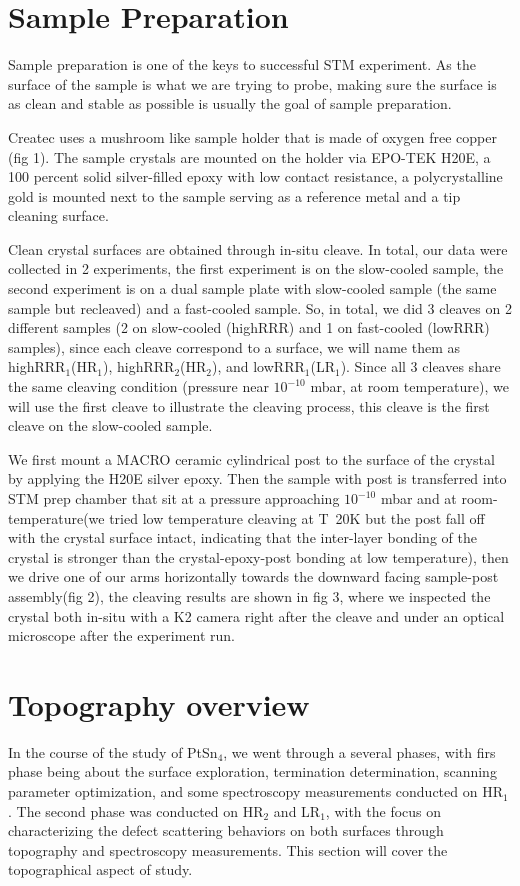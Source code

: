 \section{Sample Preparation}

Sample preparation is one of the keys to successful STM experiment. As the surface of the sample is what we are trying to probe, making sure the surface is as clean and stable as possible is usually the goal of sample preparation. 
\par Createc uses a mushroom like sample holder that is made of oxygen free copper (fig 1). The sample crystals are mounted on the holder via EPO-TEK H20E, a 100 percent solid silver-filled epoxy with low contact resistance, a polycrystalline gold is mounted next to the sample serving as a reference metal and a tip cleaning surface. 
\par Clean crystal surfaces are obtained through in-situ cleave. In total, our data were collected in 2 experiments, the first experiment is on the slow-cooled sample, the second experiment is on a dual sample plate with slow-cooled sample (the same sample but recleaved) and a fast-cooled sample. So, in total, we did 3 cleaves on 2 different samples (2 on slow-cooled  (highRRR) and 1 on fast-cooled (lowRRR) samples), since each cleave correspond to a surface, we will name them as highRRR$_1$(HR$_1$), highRRR$_2$(HR$_2$), and lowRRR$_1$(LR$_1$). Since all 3 cleaves share the same cleaving condition (pressure near $10^{-10}$ mbar, at room temperature), we will use the first cleave to illustrate the cleaving process, this cleave is the first cleave on the slow-cooled sample. 
\par We first mount a MACRO ceramic cylindrical post to the surface of the crystal by applying the H20E silver epoxy. Then the sample with post is transferred into STM prep chamber that sit at a pressure approaching $10^{-10}$ mbar and at room-temperature(we tried low temperature cleaving at T~20K but the post fall off with the crystal surface intact, indicating that the inter-layer bonding of the crystal is stronger than the crystal-epoxy-post bonding at low temperature), then we drive one of our arms horizontally towards the downward facing sample-post assembly(fig 2), the cleaving results are shown in fig 3, where we inspected the crystal both in-situ with a K2 camera right after the cleave and under an optical microscope after the experiment run. 


\section{Topography overview}
In the course of the study of PtSn$_4$, we went through a several phases, with firs phase being about the surface exploration, termination determination, scanning parameter optimization, and some spectroscopy measurements conducted on HR$_1$. The second phase was conducted on HR$_2$ and LR$_1$, with the focus on characterizing the defect scattering behaviors on both surfaces through topography and spectroscopy measurements. This section will cover the topographical aspect of study. 

